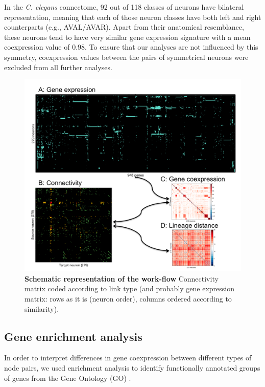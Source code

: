 \documentclass[10pt,letterpaper]{article}
\begin{document}
In the \emph{C. elegans} connectome, 92 out of 118 classes of neurons have bilateral representation, meaning that each of those neuron classes have both left and right counterparts (e.g., AVAL/AVAR).
Apart from their anatomical resemblance, these neurons tend to have very similar gene expression signature with a mean coexpression value of 0.98.
To ensure that our analyses are not influenced by this symmetry, coexpression values between the pairs of symmetrical neurons were excluded from all further analyses.
 \begin{figure}[!ht]
  \centering
    \includegraphics[width=1\textwidth]{SchematicDATA}
 \caption{{\bf Schematic representation of the work-flow}
Connectivity matrix coded according to link type (and probably gene expression matrix: rows as it is (neuron order), columns ordered according to similarity).}
 \label{fig:SchematicRepresentation}
 \end{figure}

\subsection*{Gene enrichment analysis}
In order to interpret differences in gene coexpression between different types of node pairs, we used enrichment analysis to identify functionally annotated groups of genes from the Gene Ontology (GO) \cite{Ashburner2000}.
\end{document}
